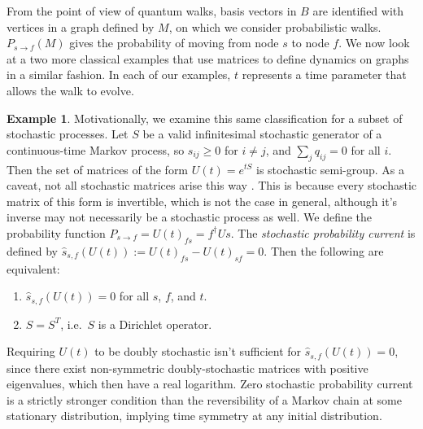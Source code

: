 \documentclass[twocolumn,superscriptaddress]{revtex4-1}
\theoremstyle{plain}
\theoremstyle{definition}
\theoremstyle{definition}
\theoremstyle{definition}
\theoremstyle{definition}
\newtheorem{example}[theorem]{Example}
\theoremstyle{definition}
\theoremstyle{definition}
\newcommand{\jb}[1]{\todo[inline]{{\textbf{[}JB: #1\textbf{]}}}}
\newcommand{\jt}[1]{\todo[inline]{\textcolor{dblue}{\textbf{[}JT: #1\textbf{]}}}}
\begin{document}
From the point of view of quantum walks,  basis vectors in $B$ are identified with vertices in a graph defined by $M$, on which we consider probabilistic walks. $P_{s\to f}(M)$ gives the probability of moving from node $s$ to node $f$. We now look at a two more classical examples that use matrices to define dynamics on graphs in a similar fashion. In each of our examples, $t$ represents a time parameter that allows the walk to evolve.

\begin{example}\label{ex:stochastic}
Motivationally, we examine this same classification for a subset of stochastic processes. Let $S$ be a valid infinitesimal stochastic generator of a continuous-time Markov process, so $s_{ij}\geq 0$ for $i\neq j$, and $\sum_j q_{ij}=0$ for all $i$.  Then the set of matrices of the form $U(t)=e^{tS}$ is stochastic semi-group. As a caveat, not all stochastic matrices arise this way \cite{davies2010embeddable}. This is because every stochastic matrix of this form is invertible, which is not the case in general, although it's inverse may not necessarily be a stochastic process as well. We define the probability function $P_{s\to f}=U(t)_{fs}=f^\dagger Us$. The \emph{stochastic probability current} is defined by $\hat{s}_{s,f}(U(t)):=U(t)_{fs}-U(t)_{sf}=0$. Then the 
following are equivalent:
\begin{enumerate}
 \item $\hat{s}_{s,f}(U(t))=0$ for all $s$, $f$, and $t$.
 \item $S=S^T$, i.e.\ $S$ is a Dirichlet operator. 
 \end{enumerate}
\end{example}
Requiring $U(t)$ to be doubly stochastic isn't sufficient for $\hat{s}_{s,f}(U(t))=0$, since there exist non-symmetric doubly-stochastic matrices with positive eigenvalues, which then have a real logarithm. 
Zero stochastic probability current is a strictly stronger condition than the reversibility of a Markov chain at some stationary distribution, implying time symmetry at any initial distribution.
\end{document}
